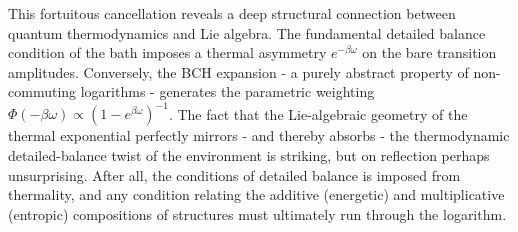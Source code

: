 This fortuitous cancellation reveals a deep structural connection between quantum thermodynamics and Lie algebra. The fundamental detailed balance condition of the bath imposes a thermal asymmetry $e^{-\beta\omega}$ on the bare transition amplitudes. Conversely, the BCH expansion - a purely abstract property of non-commuting logarithms - generates the parametric weighting $\Phi(-\beta\omega) \propto (1-e^{\beta\omega})^{-1}$. The fact that the Lie-algebraic geometry of the thermal exponential perfectly mirrors - and thereby absorbs - the thermodynamic detailed-balance twist of the environment is striking, but on reflection perhaps unsurprising. After all, the conditions of detailed balance is imposed from thermality, and any condition relating the additive (energetic) and multiplicative (entropic) compositions of structures must ultimately run through the logarithm.  






